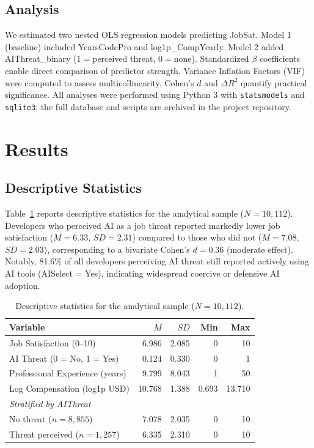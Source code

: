 \documentclass[11pt]{article}
\begin{document}
\subsection{Analysis}

We estimated two nested OLS regression models predicting JobSat. Model 1 (baseline)
included YearsCodePro and log1p\_CompYearly. Model 2 added AIThreat\_binary ($1 = $perceived
threat, $0 = $none). Standardized $\beta$ coefficients enable direct comparison of predictor
strength. Variance Inflation Factors (VIF) were computed to assess multicollinearity.
Cohen's $d$ and $\Delta R^2$ quantify practical significance. All analyses were performed
using Python 3 with \texttt{statsmodels} and \texttt{sqlite3}; the full database and
scripts are archived in the project repository.

\section{Results}

\subsection{Descriptive Statistics}

Table~\ref{tab:desc} reports descriptive statistics for the analytical sample ($N = 10{,}112$).
Developers who perceived AI as a job threat reported markedly lower job satisfaction
($M = 6.33$, $SD = 2.31$) compared to those who did not ($M = 7.08$, $SD = 2.03$),
corresponding to a bivariate Cohen's $d = 0.36$ (moderate effect). Notably, 81.6\% of
all developers perceiving AI threat still reported actively using AI tools (AISelect = Yes),
indicating widespread coercive or defensive AI adoption.

\begin{table}[h]
\centering
\caption{Descriptive statistics for the analytical sample ($N = 10{,}112$).}
\label{tab:desc}
\begin{tabular}{lrrrr}
\toprule
Variable & $M$ & $SD$ & Min & Max \\
\midrule
Job Satisfaction (0--10) & 6.986 & 2.085 & 0 & 10 \\
AI Threat (0 = No, 1 = Yes) & 0.124 & 0.330 & 0 & 1 \\
Professional Experience (years) & 9.799 & 8.043 & 1 & 50 \\
Log Compensation (log1p USD) & 10.768 & 1.388 & 0.693 & 13.710 \\
\midrule
\multicolumn{5}{l}{\textit{Stratified by AIThreat}} \\
\quad No threat ($n = 8{,}855$) & 7.078 & 2.035 & 0 & 10 \\
\quad Threat perceived ($n = 1{,}257$) & 6.335 & 2.310 & 0 & 10 \\
\bottomrule
\end{tabular}
\end{table}
\end{document}
